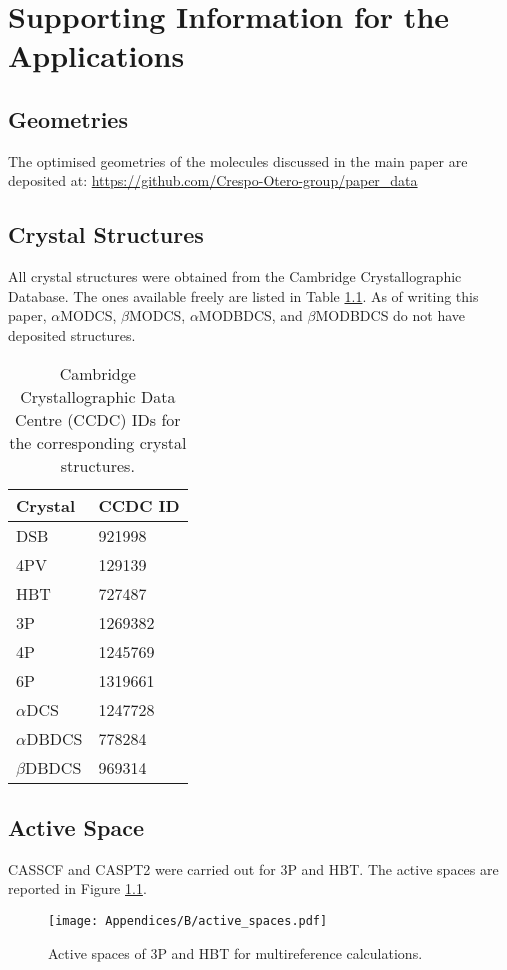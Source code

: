 \chapter{Supporting Information for the Applications}

\section{Geometries}
The optimised geometries of the molecules discussed in the main paper are deposited at: \href{https://github.com/Crespo-Otero-group/paper_data}{https://github.com/Crespo-Otero-group/paper\_data}
\section{Crystal Structures}
All crystal structures were obtained from the Cambridge Crystallographic Database. The ones available freely are listed in Table \ref{tab:ccdc}. As of writing this paper, $\alpha$MODCS, $\beta$MODCS, $\alpha$MODBDCS, and $\beta$MODBDCS do not have deposited structures.\cite{Shi2019}

\begin{table}[]
    \centering
    \begin{tabular}{ll}
    \toprule
    Crystal & CCDC ID\\\midrule
DSB	& 921998\\
4PV	& 129139\\
HBT	& 727487\\
3P	& 1269382\\
4P	& 1245769\\
6P	& 1319661\\
$\alpha$DCS	& 1247728\\
$\alpha$DBDCS	& 778284\\
$\beta$DBDCS	& 969314\\\bottomrule
    \end{tabular}
    \caption{Cambridge Crystallographic Data Centre (CCDC) IDs for the corresponding crystal structures.}
    \label{tab:ccdc}
\end{table}

\section{Active Space}
CASSCF and CASPT2 were carried out for 3P and HBT. The active spaces are reported in Figure \ref{fig:space}.

\begin{figure}
\centering
\texttt{[image: Appendices/B/active\_spaces.pdf]}
\caption{Active spaces of 3P and HBT for multireference calculations.}
\label{fig:space}
\end{figure}

